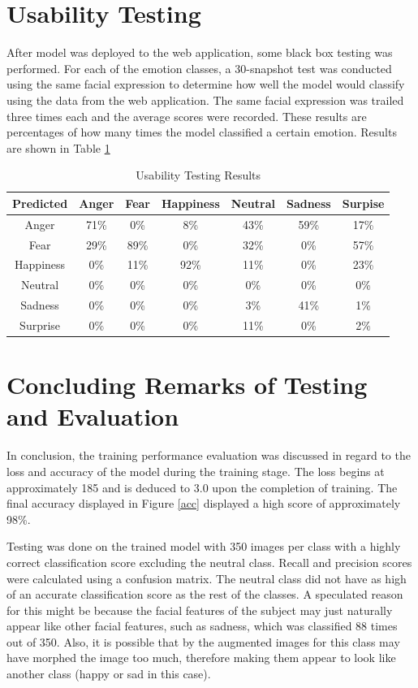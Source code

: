 \section{Usability Testing}
After model was deployed to the web application, some black box testing was performed. For each of the emotion classes, a 30-snapshot test was conducted using the same facial expression to determine how well the model would classify using the data from the web application. The same facial expression was trailed three times each and the average scores were recorded. These results are percentages of how many times the model classified a certain emotion. Results are shown in Table \ref{table:use}


\begin{table}[ht]
	\begin{center}
		\begin{tabular}{|c|c|c|c|c|c|c|}		
			\hline 
			Predicted & \textbf{Anger} &  \textbf{Fear} & \textbf{Happiness} & \textbf{Neutral} & \textbf{Sadness}& \textbf{Surpise}\\
			\hline 
			Anger & 71\% &0\% &8\% & 43\%& 59\% & 17\%\\
			\hline 
			Fear & 29\% & 89\% & 0\%& 32\%&0\% & 57\%\\
			\hline 
			Happiness &0\% &11\% &92\% & 11\%&0\% &23\% \\
			\hline 
			Neutral & 0\% &0\% &0\% & 0\%&0\% &0\% \\
			\hline 
			Sadness & 0\%&0\% &0\% & 3\%& 41\% &1\% \\
			\hline 
			Surprise & 0\%&0\% &0\% & 11\%&0\% & 2\%\\
			\hline
		\end{tabular}
		\caption{Usability Testing Results}
		\label{table:use}
	\end{center}
\end{table}
\newpage


\section{Concluding Remarks of Testing and Evaluation}
In conclusion, the training performance evaluation was discussed in regard to the loss and accuracy of the model during the training stage.
The loss begins at approximately 185 and is deduced to 3.0 upon the completion of training. The final accuracy displayed in Figure \ref{acc} displayed a high score of approximately 98\%.

Testing was done on the trained model with 350 images per class with a highly correct classification score excluding the neutral class. Recall and precision scores were calculated using a confusion matrix. The neutral class did not have as high of an accurate classification score as the rest of the classes. A speculated reason for this might be because the facial features of the subject may just naturally appear like other facial features, such as sadness, which was classified 88 times out of 350. Also, it is possible that by the augmented images for this class may have morphed the image too much, therefore making them appear to look like another class (happy or sad in this case).

